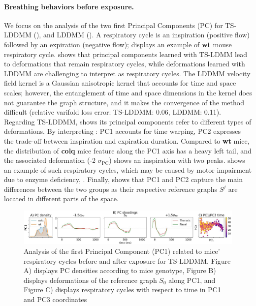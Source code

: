 \paragraph{Breathing behaviors before exposure.} We focus on the analysis of the two first Principal Components (PC) for TS-LDDMM (), and LDDMM (). A respiratory cycle is an inspiration (positive flow) followed by an expiration (negative flow);  displays an example of \textbf{wt} mouse respiratory cycle.  shows that principal components learned with TS-LDMM lead to deformations that remain respiratory cycles, while deformations learned with LDDMM are challenging to interpret as respiratory cycles. The LDDMM velocity field kernel is a Gaussian anisotropic kernel that accounts for time and space scales; however, the entanglement of time and space dimensions in the kernel does not guarantee the graph structure, and it makes the convergence of the method difficult (relative varifold loss error: TS-LDDMM: 0.06, LDDMM: 0.11). Regarding TS-LDDMM,  shows its principal components refer to different types of deformations. By interpreting : PC1 accounts for time warping, PC2 expresses the trade-off between inspiration and expiration duration. Compared to \textbf{wt} mice, the distribution of \textbf{colq} mice feature along the PC1 axis has a heavy left tail, and the associated deformation (-2 $\sigma_{\text{PC}}$) shows an inspiration with two peaks.  shows an example of such respiratory cycles, which may be caused by motor impairment due to enzyme deficiency, \cite{germain2023unsupervised}. Finally,  shows that PC1 and PC2 capture the main differences between the two groups as their respective reference graphs $S^j$ are located in different parts of the space. 

\begin{figure}[t]
  \centering
  \includegraphics[width=0.95\linewidth]{"./pictures/exp2.pdf"}
  \caption{Analysis of the first Principal Component (PC1) related to mice' respiratory cycles before and after exposure for TS-LDDMM. Figure A) displays PC densities according to mice genotype, Figure B) displays  deformations of the reference graph $S_0$ along PC1, and Figure C) displays respiratory cycles with respect to time in PC1 and PC3 coordinates}
  \label{fig:exp_2_PCA}
  \vspace{-1.5em}
\end{figure}

